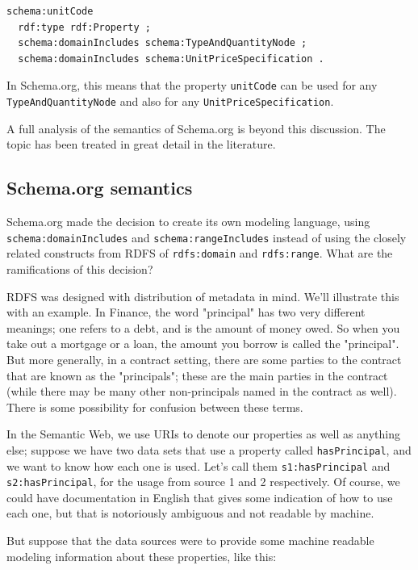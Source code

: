 \begin{lstlisting}
schema:unitCode
  rdf:type rdf:Property ;
  schema:domainIncludes schema:TypeAndQuantityNode ;
  schema:domainIncludes schema:UnitPriceSpecification .
\end{lstlisting}

In Schema.org, this means that the property \texttt{unitCode} can be used for any 
\texttt{TypeAndQuantityNode} and also for any \texttt{UnitPriceSpecification}.

A full analysis of the semantics of Schema.org is beyond this discussion.  The topic has been treated in 
great detail in the literature. \cite{patel2014analyzing}

\subsection{Schema.org semantics}

Schema.org made the decision to create its own modeling language, using \texttt{schema:domainIncludes} and 
\texttt{schema:rangeIncludes} instead of using the closely related constructs from RDFS of \texttt{rdfs:domain} 
and \texttt{rdfs:range}.  What are the ramifications of this decision? 

RDFS was designed with distribution of metadata in mind.  We'll illustrate this with an example.  In Finance, the 
word "principal" has two very different meanings; one refers to a debt, and is the amount of money owed.  
So when you take out a mortgage or a loan, the amount you borrow is called the "principal".  But more
generally, in a contract setting, there are some parties to the contract that are known as the "principals";
these are the main parties in the contract (while there may be many other non-principals named in the contract
as well).  There is some possibility for confusion between these terms.  

In the Semantic Web, we use URIs to denote our properties as well as anything else; suppose we have two data sets 
that use a property called \texttt{hasPrincipal}, and we want to know how each one is used.  Let's call them
\texttt{s1:hasPrincipal} and \texttt{s2:hasPrincipal}, for the usage from source 1 and 2 respectively.   Of course, 
we could have documentation in English that gives some indication of how to use each one, but that is notoriously
ambiguous and not readable by machine.  

But suppose that the data sources were to provide some machine readable modeling information about these properties, 
like this:

